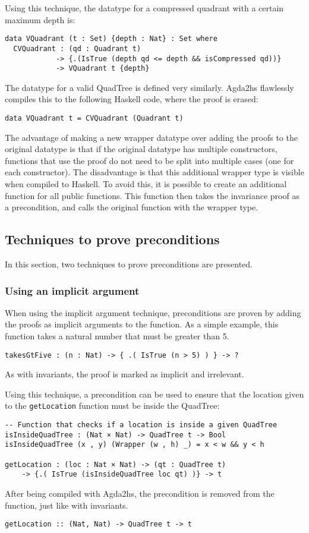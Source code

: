 Using this technique, the datatype for a compressed quadrant with a certain maximum depth is: 
\begin{verbatim}
data VQuadrant (t : Set) {depth : Nat} : Set where
  CVQuadrant : (qd : Quadrant t) 
            -> {.(IsTrue (depth qd <= depth && isCompressed qd))} 
            -> VQuadrant t {depth}
\end{verbatim}
The datatype for a valid QuadTree is defined very similarly. Agda2hs flawlessly compiles this to the following Haskell code, where the proof is erased:
\begin{verbatim}
data VQuadrant t = CVQuadrant (Quadrant t)
\end{verbatim}

The advantage of making a new wrapper datatype over adding the proofs to the original datatype is that if the original datatype has multiple constructors, functions that use the proof do not need to be split into multiple cases (one for each constructor). The disadvantage is that this additional wrapper type is visible when compiled to Haskell. To avoid this, it is possible to create an additional function for all public functions. This function then takes the invariance proof as a precondition, and calls the original function with the wrapper type. 

\subsection{Techniques to prove preconditions}
In this section, two techniques to prove preconditions are presented.

\subsubsection{Using an implicit argument} \label{using_implicit}
When using the implicit argument technique, preconditions are proven by adding the proofs as implicit arguments to the function.
As a simple example, this function takes a natural number that must be greater than 5.
\begin{verbatim}
takesGtFive : (n : Nat) -> { .( IsTrue (n > 5) ) } -> ?
\end{verbatim}
As with invariants, the proof is marked as implicit and irrelevant. 

Using this technique, a precondition can be used to ensure that the location given to the \verb|getLocation| function must be inside the QuadTree:
\begin{verbatim}
-- Function that checks if a location is inside a given QuadTree
isInsideQuadTree : (Nat × Nat) -> QuadTree t -> Bool
isInsideQuadTree (x , y) (Wrapper (w , h) _) = x < w && y < h

getLocation : (loc : Nat × Nat) -> (qt : QuadTree t) 
    -> {.( IsTrue (isInsideQuadTree loc qt) )} -> t
\end{verbatim}
After being compiled with Agda2hs, the precondition is removed from the function, just like with invariants.
\begin{verbatim}
getLocation :: (Nat, Nat) -> QuadTree t -> t
\end{verbatim}

